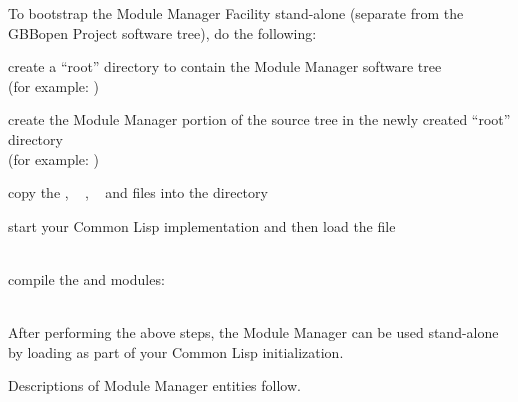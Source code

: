 \documentclass[10pt,twoside,english,pdftex]{article}
\begin{document}
To bootstrap the Module Manager Facility stand-alone (separate from the GBBopen
Project software tree), do the following:
\begin{tightitemize}
\item create a ``root'' directory to contain the Module Manager software tree\\
  (for example: )
\item create the Module Manager portion of the source tree in the newly created
  ``root'' directory\\
  (for example: )
\item copy the
  ,
  \W~
  ,
  \W~ and
  files into the  directory
\item start your Common Lisp implementation and then load the
   file\\
~~~
\item compile the  and  modules:\\
~~~
\end{tightitemize}
%
After performing the above steps, the Module Manager can be used stand-alone
by loading  as part of your
Common Lisp initialization.

\W\entities
\T{}
\T Descriptions of Module Manager entities follow.
\T\clearpage
\T\renewcommand{\headrulewidth}{0.01pt}

\end{document}
